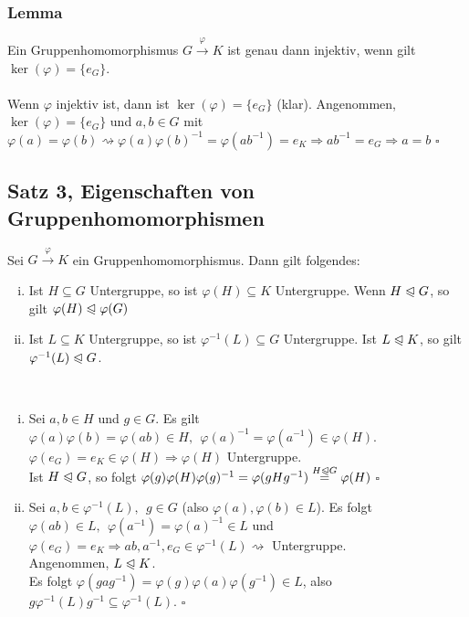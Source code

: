 \subsubsection*{Lemma}
Ein Gruppenhomomorphismus $G \stackrel{\varphi}{\to}K$ ist genau dann injektiv, wenn gilt $\ker(\varphi)=\{e_G\}$.\\

\\
Wenn $\varphi$ injektiv ist, dann ist $\ker(\varphi)=\{e_G\}$ (klar). 
Angenommen, $\ker(\varphi)=\{e_G\}$ und $a,b\in G$ mit $\varphi(a)=\varphi(b) \rightsquigarrow \varphi(a)\varphi(b)^{-1}=\varphi(ab^{-1})=e_K \Rightarrow ab^{-1}=e_G \Rightarrow a=b$
\hfill $\square$


\subsection{Satz 3, Eigenschaften von Gruppenhomomorphismen}
\label{sub:satz_eigenschaften}
Sei $G\stackrel{\varphi}{\to}K $ ein Gruppenhomomorphismus. Dann gilt folgendes:
\begin{enumerate}[(i)]
	\item Ist $H\subseteq G$ Untergruppe, so ist $\varphi(H) \subseteq K$ Untergruppe. 
	Wenn $H\trianglelefteqslant G$, so gilt $\varphi(H)\trianglelefteqslant\varphi(G)$
	\item Ist $L\subseteq K$ Untergruppe, so ist $\varphi^{-1}(L) \subseteq G$ Untergruppe. 
	Ist $L\trianglelefteqslant K$, so gilt $\varphi^{-1}(L) \trianglelefteqslant G$.
\end{enumerate}

\\
\begin{enumerate}[(i)]
	\item Sei $a,b\in H$ und $g\in G$. 
	Es gilt $\varphi(a)\varphi(b)=\varphi(ab)\in H,~~\varphi(a)^{-1}=\varphi(a^{-1})\in \varphi(H) $. $\varphi(e_G)=e_K \in \varphi(H) \Rightarrow \varphi(H)$ Untergruppe.\\
	Ist $H\trianglelefteqslant G$, so folgt $\varphi(g)\varphi(H)\varphi(g)^{-1}=\varphi(gHg^{-1})\stackrel{H\trianglelefteqslant G}{=}\varphi(H)$
	\hfill $\square$
	\item Sei $a,b \in \varphi^{-1}(L),~~g \in G$ (also $\varphi(a),\varphi(b) \in L$). 
	Es folgt $\varphi(ab)\in L,~~\varphi(a^{-1})=\varphi(a)^{-1}\in L$ und $\varphi(e_G)=e_K \Rightarrow ab, a^{-1},e_G \in \varphi^{-1}(L) \rightsquigarrow$ Untergruppe.\\
	Angenommen, $L\trianglelefteqslant K$.\\ 
	Es folgt $\varphi(gag^{-1})=\varphi(g)\varphi(a)\varphi(g^{-1}) \in L$, also $g\varphi^{-1}(L)g^{-1} \subseteq \varphi^{-1}(L)$.
	\hfill $\square$
\end{enumerate}

